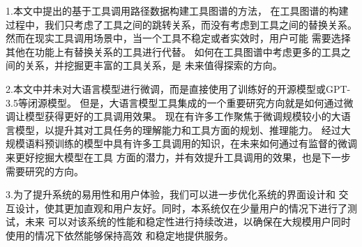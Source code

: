 \indent 1.本文中提出的基于工具调用路径数据构建工具图谱的方法，
在工具图谱的构建过程中，我们只考虑了工具之间的跳转关系，而没有考虑到工具之间的替换关系。
然而在现实工具调用场景中，当一个工具不稳定或者实效时，用户可能
需要选择其他在功能上有替换关系的工具进行代替。
如何在工具图谱中考虑更多的工具之间的关系，并挖掘更丰富的工具关系，是
未来值得探索的方向。

\indent 2.本文中并未对大语言模型进行微调，而是直接使用了训练好的开源模型或GPT-3.5等闭源模型。
但是，大语言模型工具集成的一个重要研究方向就是如何通过微调让模型获得更好的工具调用效果。
现在有许多工作聚焦于微调规模较小的大语言模型，以提升其对工具任务的理解能力和工具方面的规划、推理能力。
经过大规模语料预训练的模型中具有许多工具调用的知识，在未来如何通过有监督的微调来更好挖掘大模型在工具
方面的潜力，并有效提升工具调用的效果，也是下一步需要研究的方向。

\indent 3.为了提升系统的易用性和用户体验，我们可以进一步优化系统的界面设计和
交互设计，使其更加直观和用户友好。同时，本系统仅在少量用户的情况下进行了测试，未来
可以对该系统的性能和稳定性进行持续改进，以确保在大规模用户同时使用的情况下依然能够保持高效
和稳定地提供服务。
